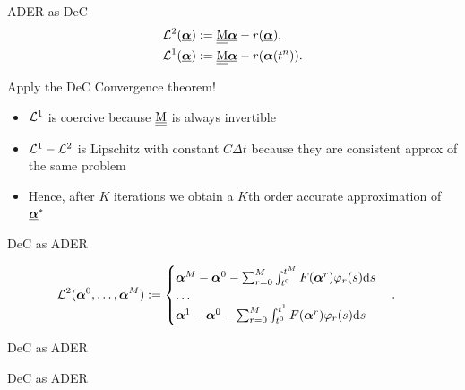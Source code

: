 \documentclass[aspectratio=169]{beamer}
\begin{document}
\begin{frame}{ADER as DeC}
\begin{align*}
& \L^2(\bbc):=\M\bbc-r(\bbc),\\
& \L^1(\bbc):= \M\bbc-r(\bc(t^n)).
\end{align*}

Apply the DeC Convergence theorem!

\begin{itemize}
\item $\L^1$ is coercive because $\M$ is always invertible
\item $\L^1-\L^2$ is Lipschitz with constant $C\Delta t$ because they are consistent approx of the same problem
\item Hence, after $K$ iterations we obtain a $K$th order accurate approximation of $\bbc^*$
\end{itemize}

\end{frame}

\begin{frame}{DeC as ADER}
	
\begin{align*}
	\L^2(\bc^0, \dots, \bc^M) &:=
	\begin{cases}
		\bc^M-\bc^0 -\sum_{r=0}^M \int_{t^0}^{t^M} F(\bc^r) \varphi_r(s) \diff s\\
		\dots\\
		\bc^1-\bc^0 - \sum_{r=0}^M \int_{t^0}^{t^1} F(\bc^r) \varphi_r(s) \diff s
	\end{cases}.
\end{align*}
	\vspace{10cm}
\end{frame}

\begin{frame}{DeC as ADER}
	
\end{frame}

\begin{frame}{DeC as ADER}
	
\end{frame}
\end{document}

